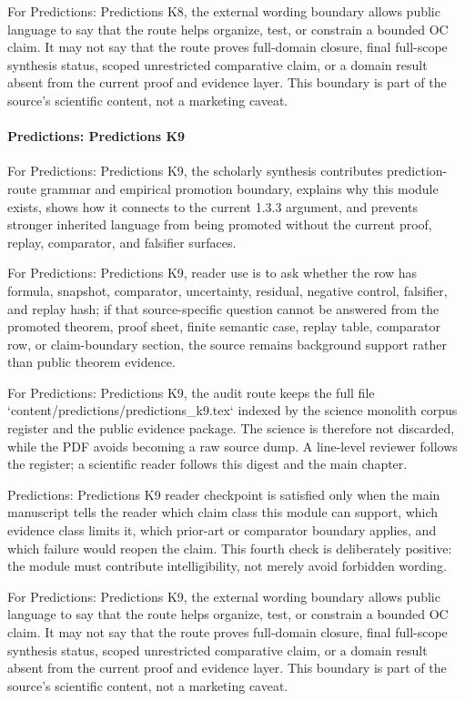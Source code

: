 For Predictions: Predictions K8, the external wording boundary allows public language to say that the route helps organize, test, or constrain a bounded OC claim. It may not say that the route proves full-domain closure, final full-scope synthesis status, scoped unrestricted comparative claim, or a domain result absent from the current proof and evidence layer. This boundary is part of the source's scientific content, not a marketing caveat.


\paragraph{Predictions: Predictions K9}

For Predictions: Predictions K9, the scholarly synthesis contributes prediction-route grammar and empirical promotion boundary, explains why this module exists, shows how it connects to the current 1.3.3 argument, and prevents stronger inherited language from being promoted without the current proof, replay, comparator, and falsifier surfaces.


For Predictions: Predictions K9, reader use is to ask whether the row has formula, snapshot, comparator, uncertainty, residual, negative control, falsifier, and replay hash; if that source-specific question cannot be answered from the promoted theorem, proof sheet, finite semantic case, replay table, comparator row, or claim-boundary section, the source remains background support rather than public theorem evidence.


For Predictions: Predictions K9, the audit route keeps the full file `content/predictions/predictions\_k9.tex` indexed by the science monolith corpus register and the public evidence package. The science is therefore not discarded, while the PDF avoids becoming a raw source dump. A line-level reviewer follows the register; a scientific reader follows this digest and the main chapter.


Predictions: Predictions K9 reader checkpoint is satisfied only when the main manuscript tells the reader which claim class this module can support, which evidence class limits it, which prior-art or comparator boundary applies, and which failure would reopen the claim. This fourth check is deliberately positive: the module must contribute intelligibility, not merely avoid forbidden wording.


For Predictions: Predictions K9, the external wording boundary allows public language to say that the route helps organize, test, or constrain a bounded OC claim. It may not say that the route proves full-domain closure, final full-scope synthesis status, scoped unrestricted comparative claim, or a domain result absent from the current proof and evidence layer. This boundary is part of the source's scientific content, not a marketing caveat.


